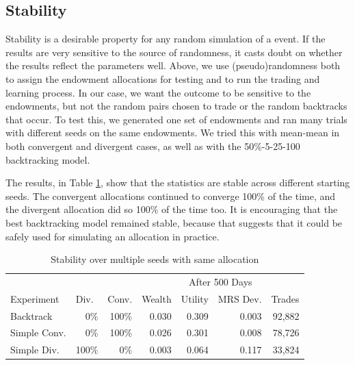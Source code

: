 \documentclass[12pt,a4paper,titlepage]{article}
\begin{document}
\subsection{Stability}
Stability is a desirable property for any random simulation of a event.
If the results are very sensitive to the source of randomness, it casts doubt on whether the results reflect the parameters well.
Above, we use (pseudo)randomness both to assign the endowment allocations for testing and to run the trading and learning process.
In our case, we want the outcome to be sensitive to the endowments, but not the random pairs chosen to trade or the random backtracks that occur. 
To test this, we generated one set of endowments and ran many trials with different seeds on the same endowments.
We tried this with mean-mean in both convergent and divergent cases, as well as with the 50\%-5-25-100 backtracking model.


The results, in Table \ref{tab:stable}, show that the statistics are stable across different starting seeds.
The convergent allocations continued to converge 100\% of the time, and the divergent allocation did so 100\% of the time too.
It is encouraging that the best backtracking model remained stable, because that suggests that it could be safely used for simulating an allocation in practice.

\begin{table}[h]
  \begin{tabular}{l|rr|rrrr}
    & \multicolumn{1}{l}{} & \multicolumn{1}{l}{} & \multicolumn{ 4}{|c}{After 500 Days} \\ 
    Experiment & \multicolumn{1}{l}{Div.} & \multicolumn{1}{l|}{Conv.} & \multicolumn{1}{l}{Wealth} & \multicolumn{1}{l}{Utility} & \multicolumn{1}{l}{MRS Dev.} & \multicolumn{1}{l}{Trades} \\ 
    \hline
    Backtrack & 0\% & 100\% & 0.030 & 0.309 & 0.003 & 92,882 \\ 
    Simple Conv. & 0\% & 100\% & 0.026 & 0.301 & 0.008 & 78,726 \\ 
    Simple Div. & 100\% & 0\% & 0.003 & 0.064 & 0.117 & 33,824 \\ 
  \end{tabular}
  \caption{Stability over multiple seeds with same allocation}
  \label{tab:stable}
\end{table}
\end{document}
